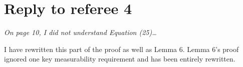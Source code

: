 \documentclass[12pt]{article}
\begin{document}
\section*{\hfill Reply to referee 4\hfill}

\emph{On page 10, I did not understand Equation (25)\dots}

I have rewritten this part of the proof as well as Lemma 6.  Lemma 6's
proof ignored one key measurability requirement and has been entirely
rewritten.
\end{document}
